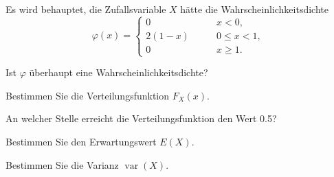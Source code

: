 Es wird behauptet, die Zufallsvariable $X$ hätte die
Wahrscheinlichkeitsdichte
\[
\varphi(x)=\begin{cases}
     0&\qquad x < 0,\\
2(1-x)&\qquad 0\le x < 1,\\
     0&\qquad x \ge 1.
\end{cases}
\]
\begin{teilaufgaben}
\item Ist $\varphi$ überhaupt eine Wahrscheinlichkeitsdichte?
\item Bestimmen Sie die Verteilungsfunktion $F_X(x)$.
\item An welcher Stelle erreicht die Verteilungsfunktion den Wert 0.5?
\item Bestimmen Sie den Erwartungswert $E(X)$.
\item Bestimmen Sie die Varianz $\operatorname{var}(X)$.
\end{teilaufgaben}



